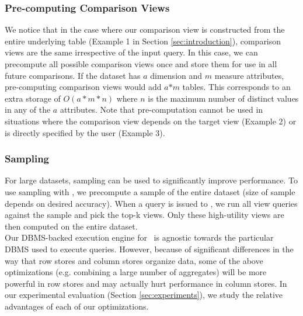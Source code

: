  \subsubsection {Pre-computing Comparison Views}
  We notice that in the case where our comparison view is constructed from the
  entire underlying table (Example 1 in Section \ref{sec:introduction}),
  comparison views are the same irrespective of the input query.
  In this case, we can precompute all possible comparison views once and store
  them for use in all future comparisons. If the dataset has $a$ dimension and
  $m$ measure attributes, pre-computing comparison views would add $a$$\ast$$m$
  tables. This corresponds to an extra storage of $O(a\ast m \ast n)$ where $n$
  is the maximum number of distinct values in any of the $a$ attributes. 
  Note that pre-computation cannot be used in situations where the comparison
  view depends on the target view (Example 2) or is directly specified by the
  user (Example 3).
  
\subsubsection {Sampling}
  For large datasets, sampling can be used to significantly improve
  performance. To use sampling with \VizRecDB, we precompute a sample of the
  entire dataset (size of sample depends on desired accuracy). When a query is
  issued to \VizRecDB, we run all view queries against the sample and pick the
  top-k views. Only these high-utility views are then computed on the entire
  dataset. \\

Our DBMS-backed execution engine for \VizRecDB\ is agnostic towards the
particular DBMS used to execute queries. 
However, because of significant differences in the way that row stores and
column stores organize data, some of the above optimizations (e.g. combining a
large number of aggregates) will be more powerful in row stores and may actually
hurt performance in column stores. In our experimental evaluation (Section
\ref{sec:experiments}), we study the relative advantages of each of our
optimizations.
